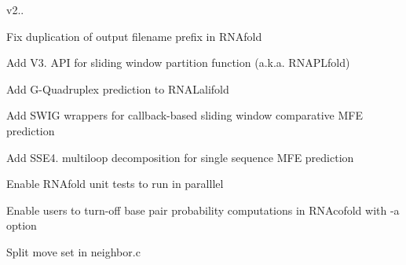 v2..
\begin{DoxyItemize}
\item Fix duplication of output filename prefix in R\+N\+Afold
\item Add V3. A\+PI for sliding window partition function (a.\+k.\+a. R\+N\+A\+P\+Lfold)
\item Add G-\/\+Quadruplex prediction to R\+N\+A\+Lalifold
\item Add S\+W\+IG wrappers for callback-\/based sliding window comparative M\+FE prediction
\item Add S\+S\+E4. multiloop decomposition for single sequence M\+FE prediction
\item Enable R\+N\+Afold unit tests to run in paralllel
\item Enable users to turn-\/off base pair probability computations in R\+N\+Acofold with -\/a option
\item Split move set in neighbor.\+c
\end{DoxyItemize}

